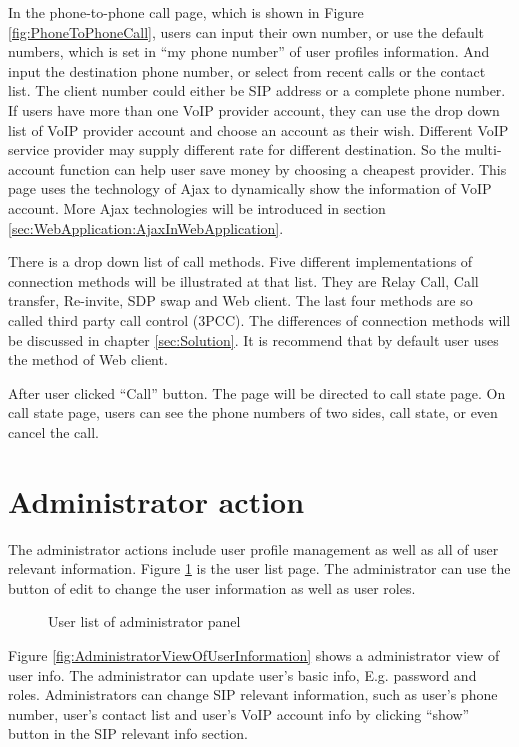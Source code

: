 In the phone-to-phone call page, which is shown in Figure \ref{fig:PhoneToPhoneCall}, users can input their own number, or use the default numbers, which is set in ``my phone number'' of user profiles information. And input the destination phone number, or select from recent calls or the contact list. The client number could either be SIP address or a complete phone number. If users have more than one VoIP provider account, they can use the drop down list of VoIP provider account and choose an account as their wish. Different VoIP service provider may supply different rate for different destination. So the multi-account function can help user save money by choosing a cheapest provider. This page uses the technology of Ajax to dynamically show the information of VoIP account. More Ajax technologies will be introduced in section \ref{sec:WebApplication:AjaxInWebApplication}. 

There is a drop down list of call methods. Five different implementations of connection methods will be illustrated at that list. They are Relay Call, Call transfer, Re-invite, SDP swap and Web client. The last four methods are so called third party call control (3PCC)\cite{RFC3725}. The differences of connection methods will be discussed in chapter \ref{sec:Solution}. It is recommend that by default user uses the method of Web client. 

After user clicked ``Call'' button. The page will be directed to call state page. On call state page, users can see the phone numbers of two sides, call state, or even cancel the call.

\section{Administrator action}
\label{sec:WebApplication:AdministratorAction}

The administrator actions include user profile management as well as all of user relevant information. 
Figure \ref{fig:UserListOfAdministratorPanel} is the user list page. The administrator can use the button of edit to change the user information as well as user roles.

\begin{figure}[!hbtp]
\centering
{}
\caption{User list of administrator panel}
\label{fig:UserListOfAdministratorPanel}
\end{figure} 

Figure \ref{fig:AdministratorViewOfUserInformation} shows a administrator view of user info. The administrator can update user's basic info, E.g. password and roles. Administrators can change SIP relevant information, such as user's phone number, user's contact list and user's VoIP account info by clicking ``show'' button in the SIP relevant info section.

